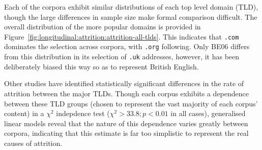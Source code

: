 Each of the corpora exhibit similar distributions of each top level domain (TLD), though the large differences in sample size make formal comparison difficult.  The overall distribution of the more popular domains is provided in Figure~\ref{fig:longitudinal:attrition:attrition-all-tlds}.  This indicates that \texttt{.com} dominates the selection across corpora, with \texttt{.org} following.  Only BE06 differs from this distribution in its selection of \texttt{.uk} addresses, however, it has been deliberately biased this way so as to represent British English.


Other studies have identified statistically significant differences in the rate of attrition between the major TLDs\cite{koehler2004longitudinal}.  
Though each corpus exhibits a dependence between these TLD groups (chosen to represent the vast majority of each corpus' content) in a $\chi^2$ indepdence test ($\chi^2 > 33.8; p<0.01$ in all cases), generalised linear models reveal that the nature of this dependence varies greatly between corpora, indicating that this estimate is far too simplistic to represent the real causes of attrition.























